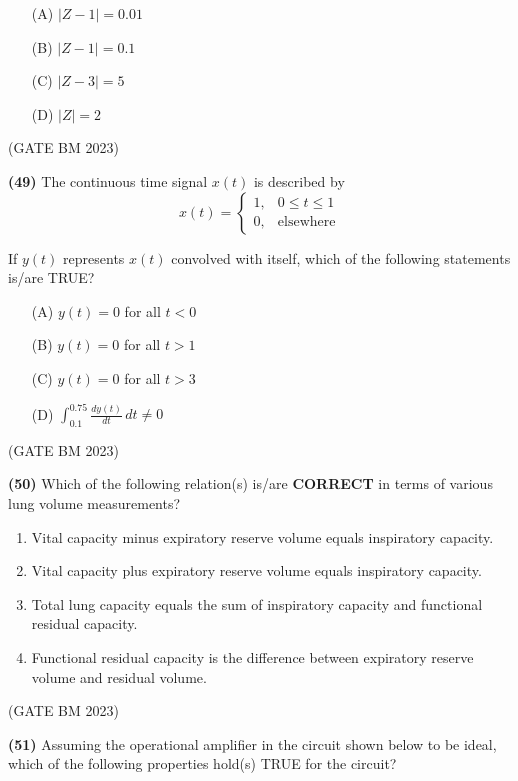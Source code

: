 \documentclass[journal]{IEEEtran}
\numberwithin{equation}{enumi}
\numberwithin{figure}{enumi}
\begin{document}
\bigskip

\begin{itemize}
    \item[(A)] \( |Z - 1| = 0.01 \)
    \item[(B)] \( |Z - 1| = 0.1 \)
    \item[(C)] \( |Z - 3| = 5 \)
    \item[(D)] \( |Z| = 2 \)
\end{itemize}
\hfill (GATE BM 2023)

\textbf{(49)}
The continuous time signal \( x(t) \) is described by
\[
x(t) = 
\begin{cases}
1, & 0 \le t \le 1 \\
0, & \text{elsewhere}
\end{cases}
\]

If \( y(t) \) represents \( x(t) \) convolved with itself, which of the following statements is/are TRUE?

\begin{itemize}
    \item[(A)] \( y(t) = 0 \) for all \( t < 0 \)
    \item[(B)] \( y(t) = 0 \) for all \( t > 1 \)
    \item[(C)] \( y(t) = 0 \) for all \( t > 3 \)
    \item[(D)] \( \displaystyle \int_{0.1}^{0.75} \frac{dy(t)}{dt} \, dt \ne 0 \)
\end{itemize}
\hfill (GATE BM 2023)

\textbf{(50)}
Which of the following relation(s) is/are \textbf{CORRECT} in terms of various lung volume measurements?

\begin{enumerate}[label=(\Alph*)]
    \item Vital capacity minus expiratory reserve volume equals inspiratory capacity.
    \item Vital capacity plus expiratory reserve volume equals inspiratory capacity.
    \item Total lung capacity equals the sum of inspiratory capacity and functional residual capacity.
    \item Functional residual capacity is the difference between expiratory reserve volume and residual volume.
\end{enumerate}
\hfill (GATE BM 2023)

\textbf{(51)}
Assuming the operational amplifier in the circuit shown below to be ideal, which of the following properties hold(s) TRUE for the circuit?
\end{document}
